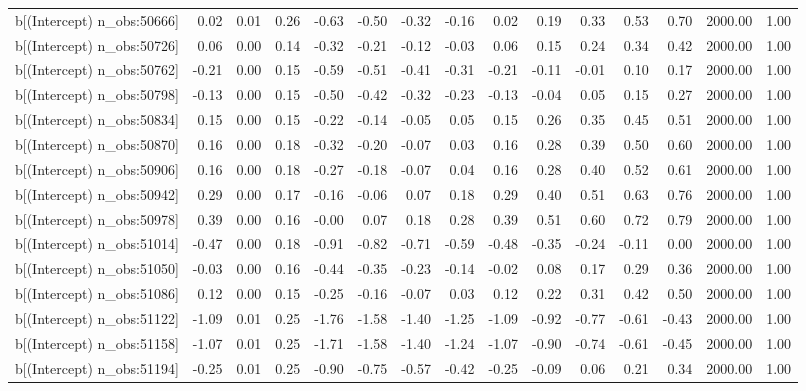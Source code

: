 \begin{table}[ht]
\begin{tabular}{rrrrrrrrrrrrrrr}
  b[(Intercept) n\_obs:50666] & 0.02 & 0.01 & 0.26 & -0.63 & -0.50 & -0.32 & -0.16 & 0.02 & 0.19 & 0.33 & 0.53 & 0.70 & 2000.00 & 1.00 \\ 
  b[(Intercept) n\_obs:50726] & 0.06 & 0.00 & 0.14 & -0.32 & -0.21 & -0.12 & -0.03 & 0.06 & 0.15 & 0.24 & 0.34 & 0.42 & 2000.00 & 1.00 \\ 
  b[(Intercept) n\_obs:50762] & -0.21 & 0.00 & 0.15 & -0.59 & -0.51 & -0.41 & -0.31 & -0.21 & -0.11 & -0.01 & 0.10 & 0.17 & 2000.00 & 1.00 \\ 
  b[(Intercept) n\_obs:50798] & -0.13 & 0.00 & 0.15 & -0.50 & -0.42 & -0.32 & -0.23 & -0.13 & -0.04 & 0.05 & 0.15 & 0.27 & 2000.00 & 1.00 \\ 
  b[(Intercept) n\_obs:50834] & 0.15 & 0.00 & 0.15 & -0.22 & -0.14 & -0.05 & 0.05 & 0.15 & 0.26 & 0.35 & 0.45 & 0.51 & 2000.00 & 1.00 \\ 
  b[(Intercept) n\_obs:50870] & 0.16 & 0.00 & 0.18 & -0.32 & -0.20 & -0.07 & 0.03 & 0.16 & 0.28 & 0.39 & 0.50 & 0.60 & 2000.00 & 1.00 \\ 
  b[(Intercept) n\_obs:50906] & 0.16 & 0.00 & 0.18 & -0.27 & -0.18 & -0.07 & 0.04 & 0.16 & 0.28 & 0.40 & 0.52 & 0.61 & 2000.00 & 1.00 \\ 
  b[(Intercept) n\_obs:50942] & 0.29 & 0.00 & 0.17 & -0.16 & -0.06 & 0.07 & 0.18 & 0.29 & 0.40 & 0.51 & 0.63 & 0.76 & 2000.00 & 1.00 \\ 
  b[(Intercept) n\_obs:50978] & 0.39 & 0.00 & 0.16 & -0.00 & 0.07 & 0.18 & 0.28 & 0.39 & 0.51 & 0.60 & 0.72 & 0.79 & 2000.00 & 1.00 \\ 
  b[(Intercept) n\_obs:51014] & -0.47 & 0.00 & 0.18 & -0.91 & -0.82 & -0.71 & -0.59 & -0.48 & -0.35 & -0.24 & -0.11 & 0.00 & 2000.00 & 1.00 \\ 
  b[(Intercept) n\_obs:51050] & -0.03 & 0.00 & 0.16 & -0.44 & -0.35 & -0.23 & -0.14 & -0.02 & 0.08 & 0.17 & 0.29 & 0.36 & 2000.00 & 1.00 \\ 
  b[(Intercept) n\_obs:51086] & 0.12 & 0.00 & 0.15 & -0.25 & -0.16 & -0.07 & 0.03 & 0.12 & 0.22 & 0.31 & 0.42 & 0.50 & 2000.00 & 1.00 \\ 
  b[(Intercept) n\_obs:51122] & -1.09 & 0.01 & 0.25 & -1.76 & -1.58 & -1.40 & -1.25 & -1.09 & -0.92 & -0.77 & -0.61 & -0.43 & 2000.00 & 1.00 \\ 
  b[(Intercept) n\_obs:51158] & -1.07 & 0.01 & 0.25 & -1.71 & -1.58 & -1.40 & -1.24 & -1.07 & -0.90 & -0.74 & -0.61 & -0.45 & 2000.00 & 1.00 \\ 
  b[(Intercept) n\_obs:51194] & -0.25 & 0.01 & 0.25 & -0.90 & -0.75 & -0.57 & -0.42 & -0.25 & -0.09 & 0.06 & 0.21 & 0.34 & 2000.00 & 1.00 \\ 

\end{tabular}
\end{table}
